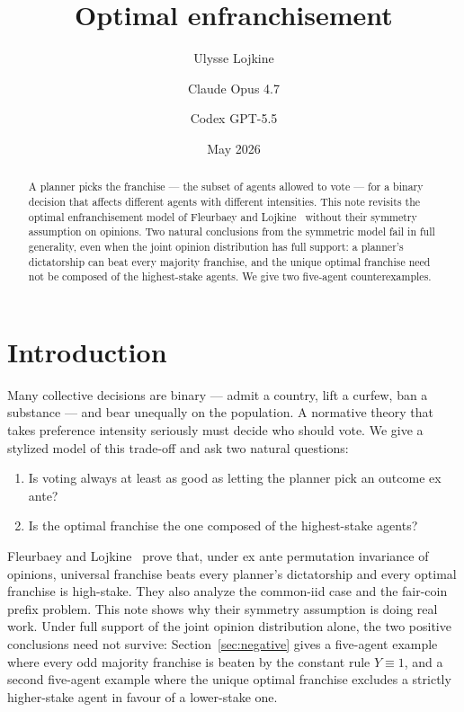 \documentclass{article}
\title{Optimal enfranchisement}
\author{Ulysse Lojkine \and Claude Opus 4.7 \and Codex GPT-5.5}
\date{May 2026}
\theoremstyle{plain}
\theoremstyle{definition}
\begin{document}
\maketitle

\begin{abstract}
A planner picks the franchise --- the subset of agents allowed to vote --- for a binary decision that affects different agents with different intensities.  This note revisits the optimal enfranchisement model of Fleurbaey and Lojkine~\cite{fleurbaey-lojkine} without their symmetry assumption on opinions.  Two natural conclusions from the symmetric model fail in full generality, even when the joint opinion distribution has full support: a planner's dictatorship can beat every majority franchise, and the unique optimal franchise need not be composed of the highest-stake agents.  We give two five-agent counterexamples.
\end{abstract}

\section{Introduction}

Many collective decisions are binary --- admit a country, lift a curfew, ban a substance --- and bear unequally on the population.  A normative theory that takes preference intensity seriously must decide who should vote.  We give a stylized model of this trade-off and ask two natural questions:
\begin{enumerate}
    \item Is voting always at least as good as letting the planner pick an outcome ex ante?
    \item Is the optimal franchise the one composed of the highest-stake agents?
\end{enumerate}
Fleurbaey and Lojkine~\cite{fleurbaey-lojkine} prove that, under ex ante permutation invariance of opinions, universal franchise beats every planner's dictatorship and every optimal franchise is high-stake.  They also analyze the common-iid case and the fair-coin prefix problem.  This note shows why their symmetry assumption is doing real work.  Under full support of the joint opinion distribution alone, the two positive conclusions need not survive: Section~\ref{sec:negative} gives a five-agent example where every odd majority franchise is beaten by the constant rule $Y \equiv 1$, and a second five-agent example where the unique optimal franchise excludes a strictly higher-stake agent in favour of a lower-stake one.
\end{document}
